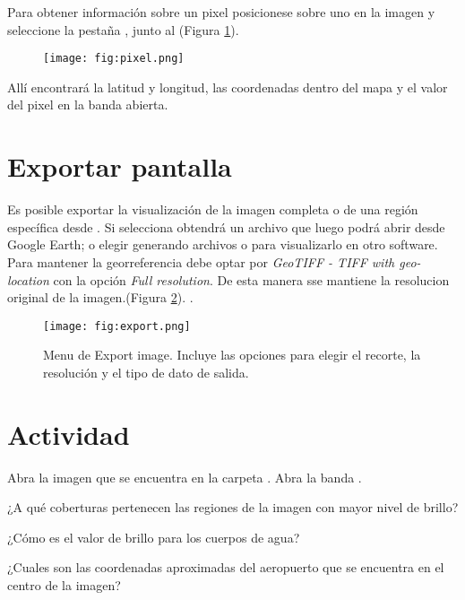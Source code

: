 Para obtener información sobre un pixel posicionese sobre uno en la imagen y seleccione la pestaña , junto al  (Figura \ref{fig:pixel}).

\begin{figure}[h!]
    \centering
    \texttt{[image: fig:pixel.png]}
    \caption{}
    \label{fig:pixel}
\end{figure}

Allí encontrará la latitud y longitud, las coordenadas dentro del mapa y el valor del pixel en la banda abierta.

\section{Exportar pantalla}

Es posible exportar la visualización de la imagen completa o de una región específica desde . Si selecciona  obtendrá un archivo  que luego podrá abrir desde Google Earth; o elegir  generando archivos  o  para visualizarlo en otro software. Para mantener la georreferencia debe optar por \emph{GeoTIFF - TIFF with geo-location} con la opción \emph{Full resolution}. De esta manera sse mantiene la resolucion original de la imagen.(Figura \ref{fig:export}).
.

\begin{figure}[h!]
    \centering
    \texttt{[image: fig:export.png]}
    \caption{Menu de Export image. Incluye las opciones para elegir el recorte, la resolución y el tipo de dato de salida.}
    \label{fig:export}
\end{figure}

\section{Actividad}

Abra la imagen que se encuentra en la carpeta . Abra la banda .

\begin{que}
    ¿A qué coberturas pertenecen las regiones de la imagen con mayor nivel de brillo?
\end{que}

\begin{que}
    ¿Cómo es el valor de brillo para los cuerpos de agua?
\end{que}

\begin{que}
    ¿Cuales son las coordenadas aproximadas del aeropuerto que se encuentra en el centro de la imagen?
\end{que}

